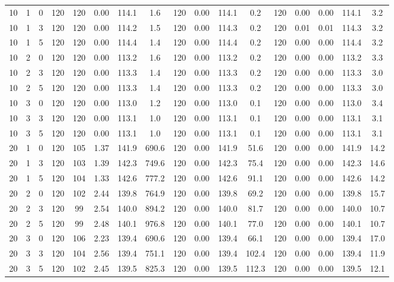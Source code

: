 \documentclass[3p, authoryear, 11pt]{elsarticle}
\begin{document}
\begin{table}[H]
\begin{tabular}{cccc cccc cccc ccccc}
    10 & 1 & 0 & 120 & 120 & 0.00 & 114.1 & 1.6 & 120 & 0.00 & 114.1 & 0.2 & 120 & 0.00 & 0.00 & 114.1 & 3.2 \\
    10 & 1 & 3 & 120 & 120 & 0.00 & 114.2 & 1.5 & 120 & 0.00 & 114.3 & 0.2 & 120 & 0.01 & 0.01 & 114.3 & 3.2 \\
    10 & 1 & 5 & 120 & 120 & 0.00 & 114.4 & 1.4 & 120 & 0.00 & 114.4 & 0.2 & 120 & 0.00 & 0.00 & 114.4 & 3.2 \\
    \cmidrule{1-17}
    10 & 2 & 0 & 120 & 120 & 0.00 & 113.2 & 1.6 & 120 & 0.00 & 113.2 & 0.2 & 120 & 0.00 & 0.00 & 113.2 & 3.3 \\
    10 & 2 & 3 & 120 & 120 & 0.00 & 113.3 & 1.4 & 120 & 0.00 & 113.3 & 0.2 & 120 & 0.00 & 0.00 & 113.3 & 3.0 \\
    10 & 2 & 5 & 120 & 120 & 0.00 & 113.3 & 1.4 & 120 & 0.00 & 113.3 & 0.2 & 120 & 0.00 & 0.00 & 113.3 & 3.0 \\
    \cmidrule{1-17}
    10 & 3 & 0 & 120 & 120 & 0.00 & 113.0 & 1.2 & 120 & 0.00 & 113.0 & 0.1 & 120 & 0.00 & 0.00 & 113.0 & 3.4 \\
    10 & 3 & 3 & 120 & 120 & 0.00 & 113.1 & 1.0 & 120 & 0.00 & 113.1 & 0.1 & 120 & 0.00 & 0.00 & 113.1 & 3.1 \\
    10 & 3 & 5 & 120 & 120 & 0.00 & 113.1 & 1.0 & 120 & 0.00 & 113.1 & 0.1 & 120 & 0.00 & 0.00 & 113.1 & 3.1 \\
    \midrule
    20 & 1 & 0 & 120 & 105 & 1.37 & 141.9 & 690.6 & 120 & 0.00 & 141.9 & 51.6 & 120 & 0.00 & 0.00 & 141.9 & 14.2 \\
    20 & 1 & 3 & 120 & 103 & 1.39 & 142.3 & 749.6 & 120 & 0.00 & 142.3 & 75.4 & 120 & 0.00 & 0.00 & 142.3 & 14.6 \\
    20 & 1 & 5 & 120 & 104 & 1.33 & 142.6 & 777.2 & 120 & 0.00 & 142.6 & 91.1 & 120 & 0.00 & 0.00 & 142.6 & 14.2 \\
    \cmidrule{1-17}
    20 & 2 & 0 & 120 & 102 & 2.44 & 139.8 & 764.9 & 120 & 0.00 & 139.8 & 69.2 & 120 & 0.00 & 0.00 & 139.8 & 15.7 \\
    20 & 2 & 3 & 120 & 99 & 2.54 & 140.0 & 894.2 & 120 & 0.00 & 140.0 & 81.7 & 120 & 0.00 & 0.00 & 140.0 & 10.7 \\
    20 & 2 & 5 & 120 & 99 & 2.48 & 140.1 & 976.8 & 120 & 0.00 & 140.1 & 77.0 & 120 & 0.00 & 0.00 & 140.1 & 10.7 \\
    \cmidrule{1-17}
    20 & 3 & 0 & 120 & 106 & 2.23 & 139.4 & 690.6 & 120 & 0.00 & 139.4 & 66.1 & 120 & 0.00 & 0.00 & 139.4 & 17.0 \\
    20 & 3 & 3 & 120 & 104 & 2.56 & 139.4 & 751.1 & 120 & 0.00 & 139.4 & 102.4 & 120 & 0.00 & 0.00 & 139.4 & 11.9 \\
    20 & 3 & 5 & 120 & 102 & 2.45 & 139.5 & 825.3 & 120 & 0.00 & 139.5 & 112.3 & 120 & 0.00 & 0.00 & 139.5 & 12.1 \\
    \midrule



\end{tabular}
\end{table}
\end{document}
